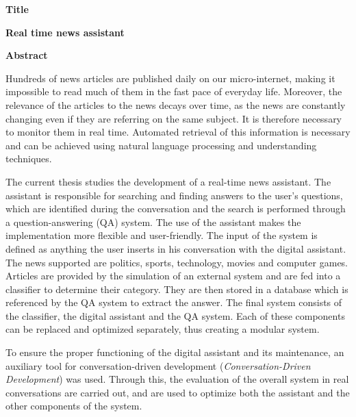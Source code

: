 {\selectfont

{}


\begin{center}
  \centering
  \textbf{\Large{Title}}
  \vspace{0.5cm}

  \textbf{\large{Real time news assistant}}

  \vspace{1cm}

  \centering
  \textbf{Abstract}
\end{center}

Hundreds of news articles are published daily on our micro-internet, making it \linebreak impossible to read much of them in the fast pace of everyday life. Moreover, the relevance of the articles to the news decays over time, as the news are constantly changing even if they are referring  on the same subject. It is therefore necessary to monitor them in real time. Automated retrieval of this information is necessary and can be achieved using natural language processing and understanding techniques.

The current thesis studies the development of a real-time news assistant. The assistant is responsible for searching and finding answers to the user's questions, which are identified during the conversation and the search is performed through a question-answering (QA) system. The use of the assistant makes the implementation more flexible and user-friendly. The input of the system is defined as anything the user inserts in his conversation with the digital assistant. The news supported are politics, sports, technology, movies and computer games. Articles are provided by the simulation of an external system and are fed into a classifier to determine their category. They are then stored in a database which is referenced by the QA system to extract the answer. The final system consists of the classifier, the digital assistant and the QA system. Each of these components can be replaced and optimized  separately, thus creating a modular system.

To ensure the proper functioning of the digital assistant and its maintenance, an auxiliary  tool for conversation-driven development (\emph{Conversation-Driven Development}) was used. Through this, the evaluation of the overall system in real conversations are carried out, and are used to optimize both the assistant and the other components of the system.

}

